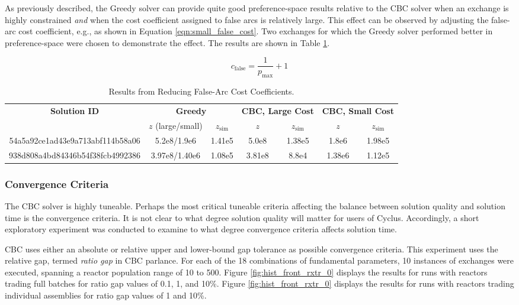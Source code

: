 As previously described, the Greedy solver can provide quite good
preference-space results relative to the CBC solver when an exchange is highly
constrained \textit{and} when the cost coefficient assigned to false arcs is
relatively large. This effect can be observed by adjusting the false-arc cost
coefficient, e.g., as shown in Equation \ref{eqn:small_false_cost}. Two
exchanges for which the Greedy solver performed better in preference-space were
chosen to demonstrate the effect. The results are shown in Table
\ref{tbl:false_arcs}.

\begin{equation}\label{eqn:small_false_cost}
c_\text{false} = \frac{1}{p_\text{max}} + 1
\end{equation}

\begin{table}[h!]
\centering
\caption{Results from Reducing False-Arc Cost Coefficients.}
\label{tbl:false_arcs}
\begin{tabular}{|c|c|c|c|c|c|c|}
\hline
\multirow{2}{*}{\textbf{Solution ID}} 
& \multicolumn{2}{c|}{\textbf{Greedy}} 
& \multicolumn{2}{c|}{\textbf{CBC, Large Cost}} 
& \multicolumn{2}{c|}{\textbf{CBC, Small Cost}} \\ \cline{2-7} 
& $z$ (large/small)        & $z_{\text{sim}}$        
& $z$             & $z_{\text{sim}}$            
& $z$             & $z_{\text{sim}}$            \\ \hline
54a5a92ce1ad43e9a713abf114b58a06
& 5.2e8/1.9e6 & 1.41e5
& 5.0e8 & 1.38e5
& 1.8e6 & 1.98e5 \\ \hline
938d808a4bd84346b54f38fcb4992386
& 3.97e8/1.40e6 & 1.08e5
& 3.81e8 & 8.8e4
& 1.38e6 & 1.12e5 \\ \hline
\end{tabular}
\end{table}

\subsubsection{Convergence Criteria}

The CBC solver is highly tuneable. Perhaps the most critical tuneable criteria
affecting the balance between solution quality and solution time is the
convergence criteria. It is not clear to what degree solution quality will
matter for users of Cyclus. Accordingly, a short exploratory experiment was
conducted to examine to what degree convergence criteria affects solution time.

CBC uses either an absolute or relative upper and lower-bound gap tolerance as
possible convergence criteria. This experiment uses the relative gap, termed
\textit{ratio gap} in CBC parlance. For each of the 18 combinations of
fundamental parameters, 10 instances of exchanges were executed, spanning a
reactor population range of 10 to 500. Figure \ref{fig:hist_front_rxtr_0}
displays the results for runs with reactors trading full batches for ratio gap
values of 0.1, 1, and 10\%. Figure \ref{fig:hist_front_rxtr_0} displays the
results for runs with reactors trading individual assemblies for ratio gap
values of 1 and 10\%.

